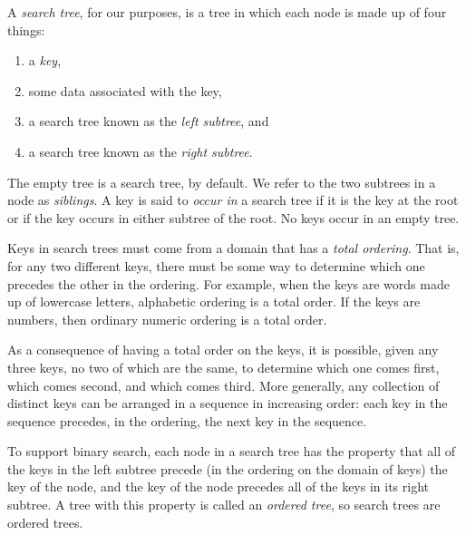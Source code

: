 \label{search-tree-def}A
\emph{search tree},
for our purposes, is a tree in which each node is made up of four things:
\begin{enumerate}
\item a \emph{key},
\item some data associated with the key,
\item a search tree known as the \emph{left subtree}, and
\item a search tree known as the \emph{right subtree}.
\end{enumerate}
The empty tree
is a search tree,  by default.
\label{sibling-def}
We refer to the two subtrees in a node as
\emph{siblings}.
A key is said to
\label{occurs-in-def}\emph{occur in}
a search tree if it is the key at the root
or if the key occurs in either subtree of the root.
No keys occur in an empty tree.

Keys in search trees must come from a domain that has a
\label{total-ordering-def}\emph{total ordering}.
That is, for any two different keys,
there must be some way to determine
which one precedes the other in the ordering.
For example, when the keys are words made up of lowercase letters,
alphabetic ordering is a total order.
If the keys are numbers, then ordinary numeric ordering is a total order.

As a consequence of having a total order on the keys,
it is possible, given any three keys,
no two of which are the same,
to determine which one comes first,
which comes second, and which comes third.
More generally, any collection of distinct keys
can be arranged in a sequence in increasing order:
each key in the sequence
precedes, in the ordering, the next key in the sequence.

To support binary search,
each node in a search tree
has the property that all of the keys in the left subtree
precede (in the ordering on the domain of keys)
the key of the node, and the key of the node precedes all of
the keys in its right subtree.
A tree with this property is called an
\label{ordered-def}\emph{ordered tree},
so search trees are ordered trees.

